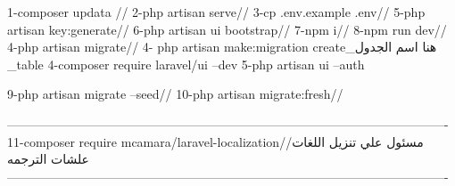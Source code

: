1-composer updata //
2-php artisan serve//
3-cp .env.example .env//
5-php artisan key:generate//
6-php artisan ui bootstrap//
7-npm i//
8-npm run dev//
4-php artisan migrate//
4- php artisan make:migration create_هنا اسم الجدول _table
4-composer require laravel/ui --dev
5-php artisan ui --auth

9-php artisan migrate --seed//
10-php artisan migrate:fresh//

----------------------------------------------------------------------------------------------------------
11-composer require mcamara/laravel-localization//مسئول علي تنزيل اللغات علشات الترجمه 
----------------------------------------------------------------------------------------------------------

